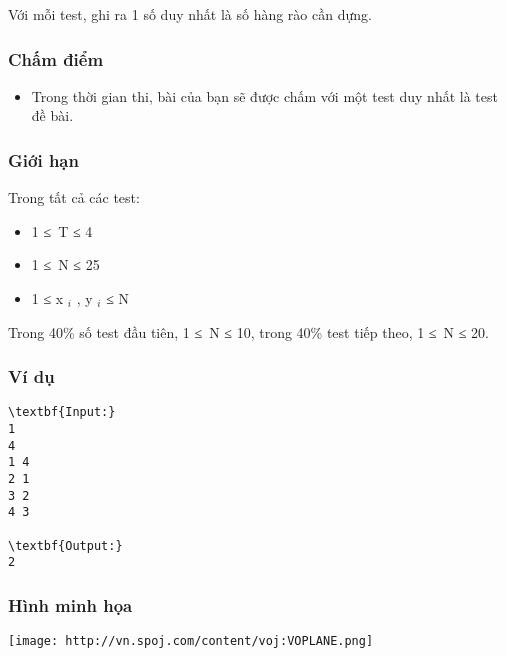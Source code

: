 Với mỗi test, ghi ra 1 số duy nhất là số hàng rào cần dựng.

\subsubsection{Chấm điểm}
\begin{itemize}
	\item Trong thời gian thi, bài của bạn sẽ được chấm với một test duy nhất là test đề bài.
\end{itemize}

\subsubsection{Giới hạn}

Trong tất cả các test:
\begin{itemize}
	\item 1 ≤ T ≤ 4
	\item 1 ≤ N ≤ 25
	\item 1 ≤ x $_ i $ , y $_ i $ ≤ N
\end{itemize}

Trong 40\% số test đầu tiên, 1 ≤ N ≤ 10, trong 40\% test tiếp theo, 1 ≤ N ≤ 20.

\subsubsection{Ví dụ}
\begin{verbatim}
\textbf{Input:}
1
4
1 4
2 1
3 2
4 3

\textbf{Output:}
2
\end{verbatim}

\subsubsection{Hình minh họa}


\texttt{[image: http://vn.spoj.com/content/voj:VOPLANE.png]}